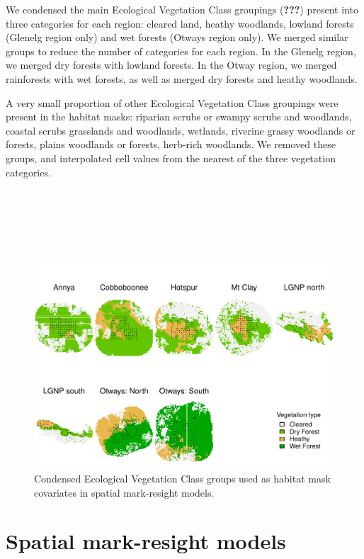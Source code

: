 \documentclass[11pt,a4paper,titlepage,twoside,openright]{style/unimelbthesis}
\begin{document}
\begin{mainmatter}
We condensed the main Ecological Vegetation Class groupings ({\textbf{???}}) present into three categories for each region: cleared land, heathy woodlands, lowland forests (Glenelg region only) and wet forests (Otways region only). We merged similar groups to reduce the number of categories for each region. In the Glenelg region, we merged dry forests with lowland forests. In the Otway region, we merged rainforests with wet forests, as well as merged dry forests and heathy woodlands.

A very small proportion of other Ecological Vegetation Class groupings were present in the habitat masks: riparian scrubs or swampy scrubs and woodlands, coastal scrubs grasslands and woodlands, wetlands, riverine grassy woodlands or forests, plains woodlands or forests, herb-rich woodlands. We removed these groups, and interpolated cell values from the nearest of the three vegetation categories.

\newpage

\(~\)

\(~\)

\(~\)
\begin{figure}

{\centering \includegraphics[width=1\linewidth]{figure/density-veg-1} 

}

\caption{Condensed Ecological Vegetation Class groups used as habitat mask covariates in spatial mark-resight models.}\label{fig:density-veg}
\end{figure}
\newpage

\hypertarget{spatial-mark-resight-models}{%
\section{Spatial mark-resight models}\label{spatial-mark-resight-models}}


\end{mainmatter}
\end{document}
